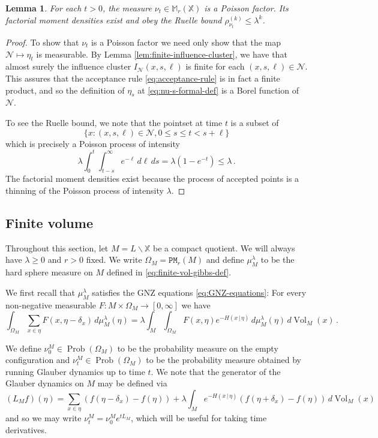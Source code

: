 \documentclass[11pt]{amsart}
\newtheorem{lemma}[theorem]{Lemma}
\theoremstyle{definition}
\theoremstyle{remark}
\newcommand{\M}{\mathbb{M}}
\newcommand{\bX}{\mathbb{X}}
\newcommand{\cP}{\mathtt{PM}}
\newcommand{\Prob}{\operatorname{Prob}}
\newcommand{\Vol}{\operatorname{Vol}}
\begin{document}
\begin{lemma}\label{lem:mu_t-Poisson-factor}
	For each $t  > 0$, the measure $\nu_t \in \M_r(\bX)$ is a Poisson factor.   Its factorial moment densities exist and obey the Ruelle bound $\rho_{\nu_t}^{(k)} \leq \lambda^k$.
\end{lemma}
\begin{proof}
	To show that $\nu_t$ is a Poisson factor we need only show that the map $\mathcal{N} \mapsto \eta_t$ is measurable.  By Lemma \ref{lem:finite-influence-cluster}, we have that almost surely the influence cluster $I_{\mathcal{N}}(x,s,\ell)$ is finite for each $(x,s,\ell) \in \mathcal{N}$.  This assures that the acceptance rule \eqref{eq:acceptance-rule} is in fact a finite product, and so the definition of $\eta_s$ at \eqref{eq:nu-s-formal-def} is a Borel function of $\mathcal{N}$.  
	
	To see the Ruelle bound, we note that the pointset at time $t$ is a subset of $$\{x : (x,s,\ell)  \in \mathcal{N}, 0 \leq s \leq t < s + \ell\}$$
	which is precisely a Poisson process of intensity $$\lambda \int_0^t \int_{t-s}^\infty e^{-\ell} \,d\ell\,ds = \lambda(1 - e^{-t}) \leq \lambda\,.$$
    The factorial moment densities exist because the process of accepted points is a thinning of the Poisson process of intensity $\lambda$.
\end{proof}


\subsection{Finite volume}

Throughout this section, let $M = L \backslash \mathbb{X}$ be a compact quotient.   We will always have $\lambda \geq 0$ and $r > 0$ fixed. We write $\Omega_M= \cP_r(M)$ and define $\mu_M^\lambda$ to be the hard sphere measure on $M$ defined in \eqref{eq:finite-vol-gibbs-def}.

We first recall that $\mu_M^\lambda$ satisfies the GNZ equations \eqref{eq:GNZ-equations}:
For every non-negative measurable $F: M \times \Omega_M \to [0,\infty]$ we have \begin{equation}\label{eq:finite-vol-GNZ}
    \int_{\Omega_M} \sum_{x \in \eta} F(x,\eta - \delta_x) \,d\mu_M^{\lambda}(\eta) = \lambda \int_M \int_{\Omega_M} F(x,\eta) e^{-H(x\,|\,\eta)} \,d\mu_M^{\lambda}(\eta)\,d\Vol_M(x)\,.
\end{equation}

We define $\nu_0^M \in \Prob(\Omega_M)$ to be the probability measure on the empty configuration and $\nu_t^M \in \Prob(\Omega_M)$ to be the probability measure obtained by running Glauber dynamics up to time $t$.  We note that the generator of the Glauber dynamics on $M$ may be defined via \begin{equation*}
	(L_M f)(\eta) = \sum_{x \in \eta}(f(\eta - \delta_x) - f(\eta)) + \lambda \int_M e^{-H(x\,|\,\eta)}(f(\eta+\delta_x) - f(\eta))\,d\Vol_M(x)
\end{equation*}
and so we may write $\nu_t^M = \nu_0^M e^{t L_M} $, which will be useful for taking time derivatives.
\end{document}
